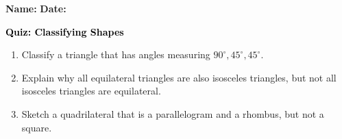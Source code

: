 \documentclass[12pt, letterpaper, fleqn]{article}
\begin{document}
\textbf{Name:} \underline{\hspace{5cm}}
\hfill
\textbf{Date:} \underline{\hspace{3cm}}\\

\begin{tcolorbox}[colback=customteal!20]
    \large\textcolor{black}{\textbf{Quiz: Classifying Shapes}}
\end{tcolorbox}
\begin{enumerate}[itemsep=3.5cm, leftmargin=0.6cm]
\item Classify a triangle that has angles measuring $90^\circ, 45^\circ, 45^\circ$.
\vspace{3.5cm}
\item Explain why all equilateral triangles are also isosceles triangles, but not all isosceles triangles are equilateral.
\vspace{3.5cm}
\item Sketch a quadrilateral that is a parallelogram and a rhombus, but not a square.
\end{enumerate}
\end{document}

